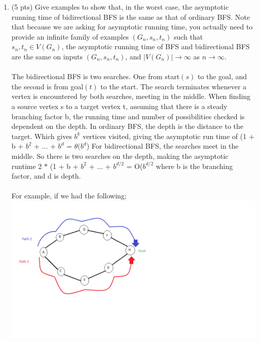\documentclass[12pt]{article}
\begin{document}
\begin{enumerate}
	\begin{enumerate}
	\item \label{1a} (5 pts) Give examples to show that, in the worst case, the asymptotic running time of bidirectional BFS is the same as that of ordinary BFS. Note that because we are asking for asymptotic running time, you actually need to provide an infinite family of examples $(G_n, s_n, t_n)$ such that $s_n,t_n \in V(G_n)$, the asymptotic running time of BFS and bidirectional BFS are the same on inputs $(G_n, s_n, t_n)$, and $|V(G_n)| \to \infty$ as $n \to \infty$.
	\\
	\\
	The bidirectional BFS is two searches. One from start$(s)$ to the goal, and the second is from goal$(t)$ to the start. The search terminates whenever a vertex is encountered by both searches, meeting in the middle. When finding a source vertex s to a target vertex t, assuming that there is a steady branching factor b, the running time and number of possibilities checked is dependent on the depth. In ordinary BFS, the depth is the distance to the target. Which gives $b^{k}$ vertices visited, giving the asymptotic run time of (1 + b + $b^{2}$ + ... + $b^{d}$ = $\theta(b^{d}$) For bidirectional BFS, the searches meet in the middle. So there is two searches on the depth, making the asymptotic runtime 2 $*$ (1 + b + $b^{2}$ + ... + $b^{d/2}$ = O($b^{d/2}$ where b is the branching factor, and d is depth. \\
	\\For example, if we had the following; \\
 

	\includegraphics[scale = 0.7]{bidirectional-example.png}
	

\end{enumerate}
\end{enumerate}
\end{document}
